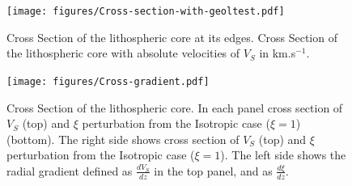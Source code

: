 \documentclass[12pt]{article}
\begin{document}


	\begin{figure}

		\centerline{\texttt{[image: figures/Cross-section-with-geoltest.pdf]}}

		\caption{\baselineskip 18pt
		Cross Section of the lithospheric core at its edges. 
		Cross Section of the lithospheric core with absolute velocities of $V_S$ in km.s$^{-1}$.}
		\label{cratoncrossedge}

	\end{figure}

	\begin{figure}

		\centerline{\texttt{[image: figures/Cross-gradient.pdf]}}

		\caption{\baselineskip 18pt
		Cross Section of the lithospheric core. 
		In each panel cross section of $V_S$ (top) and $\xi$ perturbation from the Isotropic case ($\xi = 1$) (bottom).
		The right side shows cross section of $V_S$ (top) and $\xi$ perturbation from the Isotropic case ($\xi = 1$). The left side shows the radial gradient defined as $\frac{dV_S}{dz}$ in the top panel, and as $\frac{d\xi}{dz}$.}
		\label{cratoncrosscenter}

	\end{figure}



\end{document}

